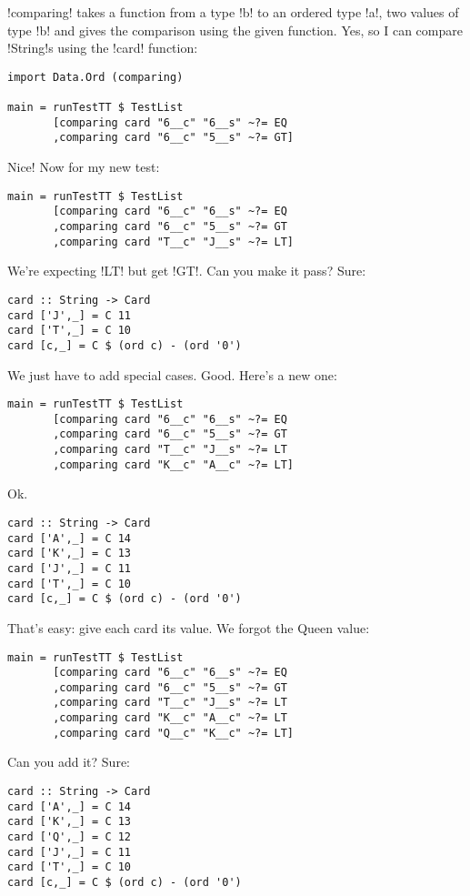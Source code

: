 \il!comparing! takes a function from a type \il!b! to an ordered type \il!a!, two values of type \il!b! and gives the comparison using the given function.
\lhN Yes, so I can compare \il!String!s using the \il!card! function:
\begin{lstlisting}[frame=single]
import Data.Ord (comparing)

main = runTestTT $ TestList 
       [comparing card "6__c" "6__s" ~?= EQ
       ,comparing card "6__c" "5__s" ~?= GT]
\end{lstlisting} %
\hspace*{\fill}
\lhA \success Nice!
\lhN Now for my new test:
\begin{lstlisting}[frame=single]
main = runTestTT $ TestList 
       [comparing card "6__c" "6__s" ~?= EQ
       ,comparing card "6__c" "5__s" ~?= GT
       ,comparing card "T__c" "J__s" ~?= LT]
\end{lstlisting} %
\failure We're expecting \il!LT! but get \il!GT!. Can you make it pass?
\lhA
\failure Sure:
\begin{lstlisting}[frame=single]
card :: String -> Card
card ['J',_] = C 11
card ['T',_] = C 10
card [c,_] = C $ (ord c) - (ord '0')
\end{lstlisting} %
\success We just have to add special cases.
\lhN Good. Here's a new one:
\begin{lstlisting}[frame=single]
main = runTestTT $ TestList 
       [comparing card "6__c" "6__s" ~?= EQ
       ,comparing card "6__c" "5__s" ~?= GT
       ,comparing card "T__c" "J__s" ~?= LT
       ,comparing card "K__c" "A__c" ~?= LT]
\end{lstlisting} %
\hspace*{\fill} 
\lhA \failure Ok. 
\begin{lstlisting}[frame=single]
card :: String -> Card
card ['A',_] = C 14
card ['K',_] = C 13
card ['J',_] = C 11
card ['T',_] = C 10
card [c,_] = C $ (ord c) - (ord '0')
\end{lstlisting} %
\success That's easy: give each card its value.
\lhN We forgot the Queen value:
\begin{lstlisting}[frame=single]
main = runTestTT $ TestList 
       [comparing card "6__c" "6__s" ~?= EQ
       ,comparing card "6__c" "5__s" ~?= GT
       ,comparing card "T__c" "J__s" ~?= LT
       ,comparing card "K__c" "A__c" ~?= LT
       ,comparing card "Q__c" "K__c" ~?= LT]
\end{lstlisting} %
Can you add it?
\lhA \failure Sure:
\begin{lstlisting}[frame=single]
card :: String -> Card
card ['A',_] = C 14
card ['K',_] = C 13
card ['Q',_] = C 12
card ['J',_] = C 11
card ['T',_] = C 10
card [c,_] = C $ (ord c) - (ord '0')
\end{lstlisting} %

